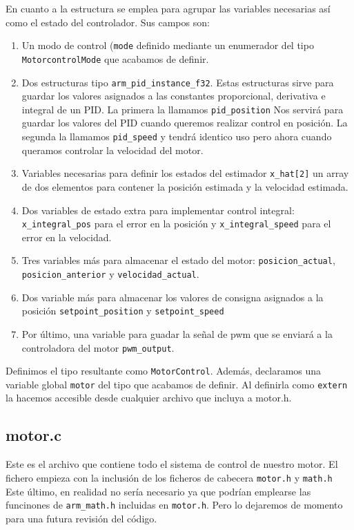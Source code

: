 En cuanto a la estructura se emplea para agrupar las variables necesarias así como el estado del controlador. Sus campos son:
\begin{enumerate}
\item Un modo de control (\texttt{mode} definido mediante un enumerador del tipo \texttt{MotorcontrolMode} que acabamos de definir.
\item Dos estructuras tipo \texttt{arm\_pid\_instance\_f32}. Estas estructuras sirve para guardar los valores asignados a las constantes proporcional, derivativa e integral de un PID. La primera la llamamos \texttt{pid\_position} Nos servirá para guardar los valores del PID cuando queremos realizar control en posición. La segunda la llamamos \texttt{pid\_speed} y tendrá identico uso pero ahora cuando queramos controlar la velocidad del motor.
\item Variables necesarias para definir los estados del estimador \texttt{x\_hat[2]} un array de dos elementos para contener la posición estimada y la velocidad estimada.
\item Dos variables de estado extra para implementar control integral: \texttt{x\_integral\_pos} para el error en la posición y \texttt{x\_integral\_speed} para el error en la velocidad.
\item Tres variables más para almacenar el estado del motor: \texttt{posicion\_actual}, \texttt{posicion\_anterior} y \texttt{velocidad\_actual}.
\item Dos variable más para almacenar los valores de consigna asignados a la posición \texttt{setpoint\_position} y \texttt{setpoint\_speed}
\item Por último, una variable para guadar la señal de pwm que se enviará a la controladora del motor \texttt{pwm\_output}.
\end{enumerate}
Definimos el tipo resultante como \texttt{MotorControl}.
Además, declaramos una variable global \texttt{motor} del tipo que acabamos de definir. Al definirla como \texttt{extern} la hacemos accesible desde cualquier archivo que incluya a motor.h.

\subsection{motor.c}
Este es el archivo que contiene todo el sistema de control de nuestro motor.
El fichero empieza con la inclusión de los ficheros de cabecera \texttt{motor.h} y \texttt{math.h} Este último, en realidad no sería necesario ya que podrían emplearse las funcinones de \texttt{arm\_math.h} incluidas en \texttt{motor.h}. Pero lo dejaremos de momento para una futura revisión del código.

